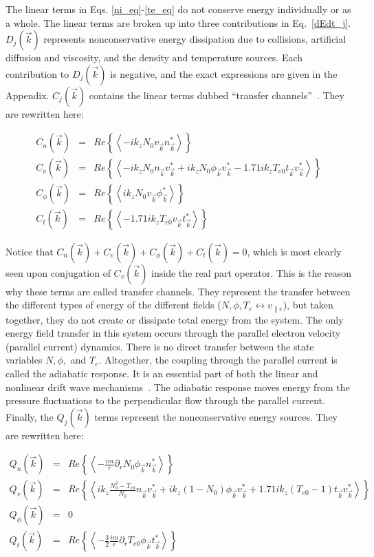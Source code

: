 \documentclass[showpacs,preprintnumbers,amsmath,amssymb,superscriptaddress,aip]{revtex4-1}
\def\beqar{\begin{eqnarray}}
\def\eeqar{\end{eqnarray}}
\def\para{\parallel}
\newcommand{\pdr}{\partial_r}
\begin{document}
The linear terms in Eqs. \ref{ni_eq}-\ref{te_eq} do not conserve energy individually or as a whole. The linear terms are broken up into three contributions in Eq.~\ref{dEdt_j}.
$D_{j}(\vec{k})$ represents nonconservative energy dissipation due to collisions, artificial diffusion and viscosity, and the density and temperature sources.
Each contribution to $D_j(\vec{k})$ is negative, and the exact expressions are given in the Appendix. 
$C_j(\vec{k})$ contains the linear terms dubbed ``transfer channels''~\cite{scott2002}. They are rewritten here:

\beqar
C_n(\vec{k}) & = & Re \left\{ \left< - i k_z N_0 v_{\vec{k}} n_{\vec{k}}^* \right> \right\}
\label{Cnk} \\
C_v(\vec{k}) & = & Re \left\{ \left< - i k_z N_0 n_{\vec{k}} v_{\vec{k}}^* + i k_z N_0 \phi_{\vec{k}} v_{\vec{k}}^*  - 1.71 i k_z T_{e0} t_{\vec{k}} v_{\vec{k}}^*  \right> \right\}
\label{Cvk} \\
C_\phi(\vec{k}) & = & Re \left\{ \left< i k_z N_0 v_{\vec{k}} \phi_{\vec{k}}^* \right> \right\}
\label{Cpk} \\
C_t(\vec{k}) & = & Re \left\{ \left< - 1.71 i k_z T_{e0} v_{\vec{k}} t_{\vec{k}}^* \right> \right\}
\label{Ctk}
\eeqar

Notice that $C_n(\vec{k}) + C_v(\vec{k}) + C_\phi(\vec{k}) + C_t(\vec{k}) = 0$, which is most clearly seen upon conjugation of $C_v(\vec{k})$ inside the real part operator.
This is the reason why these terms are called transfer channels. They represent the transfer
between the different types of energy of the different fields ($N,\phi,T_e \leftrightarrow v_{\para e}$), but taken together, they do not create or dissipate total
energy from the system. The only energy field transfer in this system occurs through the parallel electron velocity (parallel current) dynamics. There is no direct transfer between
the state variables $N, \phi,$ and $T_e$.  Altogether, the coupling through the parallel current is called the
adiabatic response. It is an essential part of both the linear and nonlinear
drift wave mechanisms~\cite{scott2002,scott2005}. The adiabatic response moves energy from the pressure fluctuations to the perpendicular flow through the parallel current. \\

Finally, the $Q_j(\vec{k})$ terms represent the nonconservative energy sources. They are rewritten here:

\beqar
Q_n(\vec{k}) & = & Re \left\{ \left< -\frac{i m}{r} \pdr N_0 \phi_{\vec{k}} n_{\vec{k}}^*  \right> \right\}
\label{Qnk} \\
Q_v(\vec{k}) & = & Re \left\{ \left<  i k_z \frac{N_0^2 - T_{e0}}{N_0} n_{\vec{k}} v_{\vec{k}}^* + i k_z (1 - N_0) \phi_{\vec{k}} v_{\vec{k}}^* + 1.71 i k_z (T_{e0} -1) t_{\vec{k}} v_{\vec{k}}^*  \right> \right\}
\label{Qvk} \\
Q_\phi(\vec{k}) & = & 0
\label{Qpk} \\
Q_t(\vec{k}) & = & Re \left\{ \left< -\frac{3}{2} \frac{i m}{r} \pdr T_{e0} \phi_{\vec{k}} t_{\vec{k}}^*  \right> \right\}
\label{Qtk}
\eeqar
\end{document}
